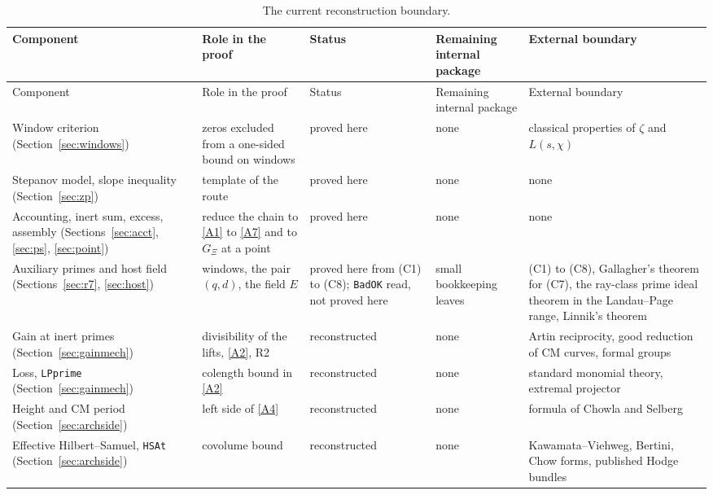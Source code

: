 \documentclass[11pt,letterpaper]{article}
\numberwithin{equation}{section}
\begin{document}
{\small
\setlength{\tabcolsep}{3.5pt}
\renewcommand{\arraystretch}{1.12}
\begin{longtable}{@{}>{\raggedright\arraybackslash}p{}>{\raggedright\arraybackslash}p{}>{\raggedright\arraybackslash}p{}>{\raggedright\arraybackslash}p{}>{\raggedright\arraybackslash}p{}@{}}
\caption{The current reconstruction boundary.}\label{tab:boundary}\\
\toprule
Component & Role in the proof & Status & Remaining internal package & External boundary\\
\midrule
\endfirsthead
\toprule
Component & Role in the proof & Status & Remaining internal package & External boundary\\
\midrule
\endhead
\bottomrule
\endfoot
Window criterion (Section~\ref{sec:windows}) & zeros excluded from a one-sided bound on windows & proved here & none & classical properties of $\zeta$ and $L(s,\chi)$\\
Stepanov model, slope inequality (Section~\ref{sec:zp}) & template of the route & proved here & none & none\\
Accounting, inert sum, excess, assembly (Sections~\ref{sec:acct}, \ref{sec:ps}, \ref{sec:point}) & reduce the chain to \eqref{A1} to \eqref{A7} and to $G_\Xi$ at a point & proved here & none & none\\
Auxiliary primes and host field (Sections~\ref{sec:r7}, \ref{sec:host}) & windows, the pair $(q,d)$, the field $E$ & proved here from (C1) to (C8); \texttt{BadOK} read, not proved here & small bookkeeping leaves & (C1) to (C8), Gallagher's theorem for (C7), the ray-class prime ideal theorem in the Landau--Page range, Linnik's theorem\\
Gain at inert primes (Section~\ref{sec:gainmech}) & divisibility of the lifts, \eqref{A2}, R2 & reconstructed & none & Artin reciprocity, good reduction of CM curves, formal groups\\
Loss, \texttt{LPprime} (Section~\ref{sec:gainmech}) & colength bound in \eqref{A2} & reconstructed & none & standard monomial theory, extremal projector\\
Height and CM period (Section~\ref{sec:archside}) & left side of \eqref{A4} & reconstructed & none & formula of Chowla and Selberg\\
Effective Hilbert--Samuel, \texttt{HSAt} (Section~\ref{sec:archside}) & covolume bound & reconstructed & none & Kawamata--Viehweg, Bertini, Chow forms, published Hodge bundles\\

\end{longtable}}
\end{document}
